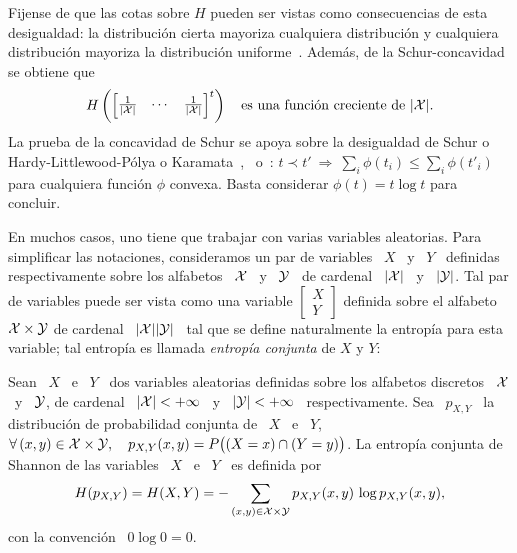 \begin{propiedades}
  Fijense de  que las cotas  sobre $H$ pueden  ser vistas como  consecuencias de
  esta desigualdad: la  distribuci\'on cierta mayoriza cualquiera distribuci\'on
  y  cualquiera distribuci\'on  mayoriza la  distribuci\'on uniforme~\cite[p.~9,
  (6)-(8)]{MarOlk11}.  Adem\'as, de la Schur-concavidad se obtiene que
  \[
  H\left( \begin{bmatrix}  \frac{1}{|\mathcal{X}|} & \cdots  & \frac{1}{|\mathcal{X}|} \end{bmatrix}^t
  \right) \quad \mbox{es una funci\'on creciente de } |\mathcal{X}|.
  \]
  La prueba  de la  concavidad de Schur se  apoya sobre la  desigualdad de  Schur o
  Hardy-Littlewood-P\'olya    o     Karamata~\cite{Sch23,    HarLit29,    Kar32,
    HarLit52},~\cite[Cap.~3,                                 Prop.~C.1]{MarOlk11}
  o~\cite[Teorema~II.3.1]{Bha97}: $t \prec t' \: \Rightarrow \: \sum_i \phi(t_i)
  \le  \sum_i  \phi(t'_i)$  para  cualquiera  funci\'on  $\phi$  convexa.  Basta
  considerar $\phi(t) = t \log t$ para concluir.
\end{propiedades}
%


En muchos  casos, uno tiene que  trabajar con varias  variables aleatorias. Para
simplificar las notaciones, consideramos  un par de variables \ $X$ \  y \ $Y$ \
definidas respectivamente sobre los alfabetos \ $\mathcal{X}$  \ y \ $\mathcal{Y}$ \ de cardenal \
$|\mathcal{X}|$ \ y \ $|\mathcal{Y}|$.  Tal par de variables puede ser vista como
una variable $\begin{bmatrix} X\\ Y\end{bmatrix}$ definida sobre el alfabeto $\mathcal{X}
\times  \mathcal{Y}$  de  cardenal \ $|\mathcal{X}| |\mathcal{Y}|$ \  tal  que  se define  naturalmente  la
entrop\'ia  para  esta  variable;  tal entrop\'ia  es  llamada  {\it  entrop\'ia
  conjunta} de $X$ y $Y$:
%
\begin{definicion}
\label{Def:SZ:EntropiaConjunta}
%
  Sean \ $X$ \ e \ $Y$  \ dos variables aleatorias definidas sobre los alfabetos
  discretos \  $\mathcal{X}$ \ y \  $\mathcal{Y}$, de cardenal  \ $|\mathcal{X}| <  +\infty$ \ y \  $|\mathcal{Y}| <
  +\infty$  \  respectivamente.    Sea  \  $p_{X,Y}$  \   la  distribuci\'on  de
  probabilidad  conjunta   de  \   $X$  \  e   \  $Y$,  \   \ie  $   \forall  \,
  (x,y)  \in \mathcal{X}  \times  \mathcal{Y}, \quad  p_{X,Y}(x,y)  = P\big(  (X =  x)  \cap (Y  =
  y) \big)$.   La entrop\'ia conjunta de  Shannon de las  variables \ $X$ \  e \
  $Y$ \ es definida por
  \[
  H(p_{X,Y}) =  H(X,Y) = -  \sum_{(x,y) \in \mathcal{X}  \times \mathcal{Y}} p_{X,Y}(x,y)  \, \log
  p_{X,Y}(x,y),
  \]
  con la convenci\'on \ $0 \log 0 = 0$.
\end{definicion}

